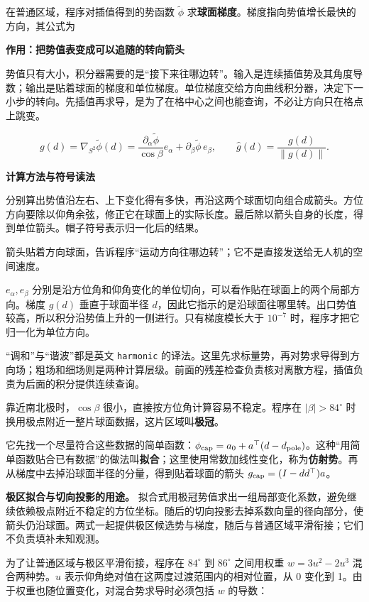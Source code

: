 \documentclass[12pt,a4paper]{article}
\numberwithin{equation}{topic}
\begin{document}
在普通区域，程序对插值得到的势函数 \(\tilde\phi\) 求\textbf{球面梯度}。梯度指向势值增长最快的方向，其公式为

\noindent\textbf{作用：把势值表变成可以追随的转向箭头}\par\nobreak
势值只有大小，积分器需要的是“接下来往哪边转”。输入是连续插值势及其角度导数；输出是贴着球面的梯度和单位梯度。单位梯度交给方向曲线积分器，决定下一小步的转向。先插值再求导，是为了在格中心之间也能查询，不必让方向只在格点上跳变。

\begin{equation}
\label{eq:gradient}
g(d)=\nabla_{S^2}\tilde\phi(d)
=\frac{\partial_\alpha\tilde\phi}{\cos\beta}e_\alpha
+\partial_\beta\tilde\phi\,e_\beta,\qquad
\hat g(d)=\frac{g(d)}{\|g(d)\|}.
\end{equation}

\noindent\textbf{计算方法与符号读法}\par\nobreak
分别算出势值沿左右、上下变化得有多快，再沿这两个球面切向组合成箭头。方位方向要除以仰角余弦，修正它在球面上的实际长度。最后除以箭头自身的长度，得到单位箭头。帽子符号表示归一化后的结果。

箭头贴着方向球面，告诉程序“运动方向往哪边转”；它不是直接发送给无人机的空间速度。


\(e_\alpha,e_\beta\) 分别是沿方位角和仰角变化的单位切向，可以看作贴在球面上的两个局部方向。梯度 \(g(d)\) 垂直于球面半径 \(d\)，因此它指示的是沿球面往哪里转。出口势值较高，所以积分沿势值上升的一侧进行。只有梯度模长大于 \(10^{-7}\) 时，程序才把它归一化为单位方向。

“调和”与“谐波”都是英文 \texttt{harmonic} 的译法。这里先求标量势，再对势求导得到方向场；粗场和细场则是两种计算层级。前面的残差检查负责核对离散方程，插值负责为后面的积分提供连续查询。

靠近南北极时，\(\cos\beta\) 很小，直接按方位角计算容易不稳定。程序在 \(|\beta|>84^\circ\) 时换用极点附近一整片球面数据，这片区域叫\textbf{极冠}。

它先找一个尽量符合这些数据的简单函数：\(\phi_{\rm cap}=a_0+a^\top(d-d_{\rm pole})\)。这种“用简单函数贴合已有数据”的做法叫\textbf{拟合}；这里使用常数加线性变化，称为\textbf{仿射势}。再从梯度中去掉沿球面半径的分量，得到贴着球面的箭头 \(g_{\rm cap}=(I-dd^\top)a\)。

\textbf{极区拟合与切向投影的用途。} 拟合式用极冠势值求出一组局部变化系数，避免继续依赖极点附近不稳定的方位坐标。随后的切向投影去掉系数向量的径向部分，使箭头仍沿球面。两式一起提供极区候选势与梯度，随后与普通区域平滑衔接；它们不负责填补未知观测。

为了让普通区域与极区平滑衔接，程序在 \(84^\circ\) 到 \(86^\circ\) 之间用权重 \(w=3u^2-2u^3\) 混合两种势。\(u\) 表示仰角绝对值在这两度过渡范围内的相对位置，从 0 变化到 1。由于权重也随位置变化，对混合势求导时必须包括 \(w\) 的导数：
\end{document}
